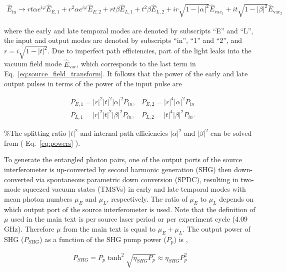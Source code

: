 \documentclass[11pt]{caltech_thesis} %
\begin{document}
\hypertarget{eq:source_field_transform}{}{
\begin{align}
    \hat{E}_{\text{in}}  \rightarrow rt \alpha e^{i\varphi} \hat{E}_{E,1} +  r^2 \alpha e^{i\varphi}\hat{E}_{E,2} + rt\beta \hat{E}_{L,1} + t^2\beta \hat{E}_{L,2} + ir\sqrt{1-|\alpha|^2}\hat{E}_{\text{vac}_1} +it\sqrt{1-|\beta|^2}\hat{E}_{\text{vac}_2} \label{eq:source_field_transform}
\end{align}
}

where the early and late temporal modes are denoted by subscripts ``E'' and ``L'', the input and output modes are denoted by subscripts ``in'', ``1'' and ``2'', and $r = i\sqrt{1-|t|^2}$. Due to imperfect path efficiencies, part of the light leaks into the vacuum field mode $\hat{E}_{\text{vac}}$, which corresponds to the last term in Eq.~\ref{eq:source_field_transform}. It follows that the power of the early and late output pulses in terms of the power of the input pulse are

\hypertarget{eq:powers}{}{
\begin{align}
    &P_{E,1} = |r|^2|t|^2|\alpha|^2 P_{in},&P_{E,2} = |r|^4 |\alpha|^2 P_{in} \label{eq:powers}\\
    &P_{L,1} = |r|^2|t|^2|\beta|^2 P_{in} ,&P_{L,2} = |t|^4 |\beta|^2 P_{in}.\nonumber 
\end{align}
}

\%The splitting ratio $|t|^2$ and internal path efficiencies $|\alpha|^2$ and $|\beta|^2$ can be solved from ( Eq.~\ref{eq:powers} ).

To generate the entangled photon pairs, one of the output ports of the source interferometer is up-converted by second harmonic generation (SHG) then down-converted via spontaneous parametric down conversion (SPDC), resulting in two-mode squeezed vacuum states (TMSVs) in early and late temporal modes with mean photon numbers $\mu_E$ and $\mu_L$, respectively. The ratio of $\mu_E$ to $\mu_L$ depends on which output port of the source interferometer is used. Note that the definition of $\mu$ used in the main text is per source laser period or per experiment cycle (4.09 GHz). Therefore $\mu$ from the main text is equal to $\mu_E + \mu_L$.
The output power of SHG ($P_{SHG}$) as a function of the SHG pump power ($P_p$) is \autocite{parameswaran2002observation},

\begin{align}
    P_{SHG} = P_{p}\tanh^2{\sqrt{\eta_{SHG}P_{p}}} \approx \eta_{SHG}P_{p}^2
\end{align}
\end{document}
